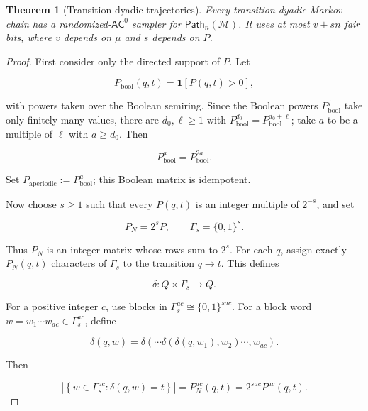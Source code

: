 \documentclass[10pt]{article}
\newtheorem{theorem}{Theorem}[section]
\theoremstyle{definition}
\newcommand{\AC}{\mathsf{AC}}
\newcommand{\Path}{\mathsf{Path}}
\newcommand{\bits}{\{0,1\}}
\newcommand{\ind}{\mathbf{1}}
\begin{document}
\begin{theorem}[Transition-dyadic trajectories]
\label{thm:transition-dyadic}
Every transition-dyadic Markov chain has a randomized-$\AC^0$ sampler for
$\Path_n(\mathcal M)$.  It uses at most $v+sn$ fair bits, where $v$ depends on
$\mu$ and $s$ depends on $P$.
\end{theorem}

\begin{proof}
First consider only the directed support of $P$.  Let

\begin{equation}
 P_{\mathrm{bool}}(q,t)=\ind[P(q,t)>0],
\end{equation}

with powers taken over the Boolean semiring.  Since the Boolean powers
$P_{\mathrm{bool}}^j$ take only finitely many values, there are
$d_0,\ell\ge1$ with $P_{\mathrm{bool}}^{d_0}=P_{\mathrm{bool}}^{d_0+\ell}$;
take $a$ to be a multiple of $\ell$ with $a\ge d_0$.  Then

\begin{equation}
 P_{\mathrm{bool}}^a=P_{\mathrm{bool}}^{2a}.
\end{equation}

Set $P_{\mathrm{aperiodic}}:=P_{\mathrm{bool}}^a$; this Boolean matrix is
idempotent.

Now choose $s\ge1$ such that every $P(q,t)$ is an integer multiple of
$2^{-s}$, and set

\begin{equation}
 P_N=2^sP,
 \qquad
 \Gamma_s=\bits^s.
\end{equation}

Thus $P_N$ is an integer matrix whose rows sum to $2^s$.  For each $q$, assign
exactly $P_N(q,t)$ characters of $\Gamma_s$ to the transition $q\to t$.  This
defines

\begin{equation}
 \delta:Q\times\Gamma_s\longrightarrow Q.
\end{equation}

For a positive integer $c$, use blocks in
$\Gamma_s^{ac}\cong\bits^{sac}$.  For a block word
$w=w_1\cdots w_{ac}\in\Gamma_s^{ac}$, define

\begin{equation}
 \delta(q,w)
 =
 \delta(\cdots\delta(\delta(q,w_1),w_2)\cdots,w_{ac}).
\end{equation}

Then

\begin{equation}
 \left|
  \left\{w\in\Gamma_s^{ac}:\delta(q,w)=t\right\}
 \right|
 =
 P_N^{ac}(q,t)
 =
 2^{sac}P^{ac}(q,t).
\end{equation}


\end{proof}
\end{document}

